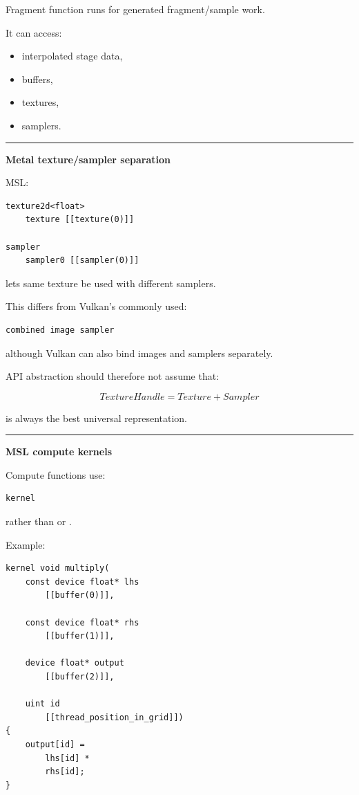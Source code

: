 Fragment function runs for generated fragment/sample work.

It can access:

\begin{itemize}
\tightlist
\item
  interpolated stage data,
\item
  buffers,
\item
  textures,
\item
  samplers.
\end{itemize}

\begin{center}\rule{0.5\linewidth}{0.5pt}\end{center}

\textbf{Metal texture/sampler separation}

MSL:

\begin{verbatim}
texture2d<float>
    texture [[texture(0)]]

sampler
    sampler0 [[sampler(0)]]
\end{verbatim}

lets same texture be used with different samplers.

This differs from Vulkan's commonly used:

\begin{verbatim}
combined image sampler
\end{verbatim}

although Vulkan can also bind images and samplers separately.

API abstraction should therefore not assume that:

\[
TextureHandle
=
Texture+Sampler
\]

is always the best universal representation.

\begin{center}\rule{0.5\linewidth}{0.5pt}\end{center}

\textbf{MSL compute kernels}

Compute functions use:

\begin{verbatim}
kernel
\end{verbatim}

rather than  or .

Example:

\begin{verbatim}
kernel void multiply(
    const device float* lhs
        [[buffer(0)]],

    const device float* rhs
        [[buffer(1)]],

    device float* output
        [[buffer(2)]],

    uint id
        [[thread_position_in_grid]])
{
    output[id] =
        lhs[id] *
        rhs[id];
}
\end{verbatim}

